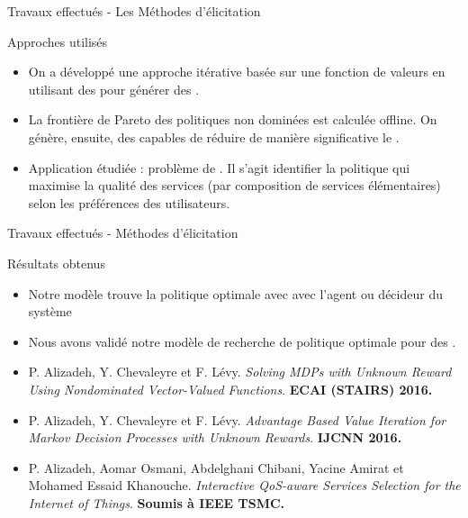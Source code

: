 \documentclass{beamer}
\newcommand{\imp}[1]{\textbf{{\color{blue}{#1}}}}
\begin{document}
{{\begin{frame}{Travaux effectués - Les Méthodes d'élicitation}
\begin{block}{Approches utilisés}
\begin{itemize}
\item On a développé une approche itérative basée sur une fonction de valeurs en utilisant des \imp{méthodes de clustering} pour générer des \imp{requ\^etes plus informatives}.
\item La frontière de Pareto des politiques non dominées est calculée offline. On génère, ensuite, des \imp{coupes} capables de réduire de manière significative le \imp{polytope des récompenses}.
\item Application étudiée : problème de \imp{composition de \textit{services web}}. Il s'agit identifier la politique qui maximise la qualité des services (par composition de services élémentaires) selon les préférences des utilisateurs.
\end{itemize}
\end{block}

\end{frame}







\begin{frame}{Travaux effectués - Méthodes d'élicitation}

\begin{block}{Résultats obtenus}
\begin{itemize}
\item Notre modèle trouve la politique optimale avec \imp{$65 \% $  moins de communications} avec l’agent ou décideur du
système
\item Nous avons validé notre modèle de recherche de politique optimale  pour des \imp{utilisateurs incertains}.%
\end{itemize}
\end{block}

\begin{itemize}
\small
\item P. Alizadeh, Y. Chevaleyre et F. Lévy. \textit{Solving MDPs with Unknown Reward Using Nondominated Vector-Valued Functions}. \textbf{ECAI (STAIRS) 2016.}
\item P. Alizadeh, Y. Chevaleyre et F. Lévy. \textit{Advantage Based Value Iteration for Markov Decision Processes with Unknown Rewards}. \textbf{IJCNN 2016.}
\item P. Alizadeh, Aomar Osmani, Abdelghani Chibani, Yacine Amirat et Mohamed Essaid Khanouche. \textit{Interactive QoS-aware Services Selection for the Internet of Things}. \textbf{Soumis à IEEE TSMC.}
\end{itemize}



\end{frame}}}
\end{document}
